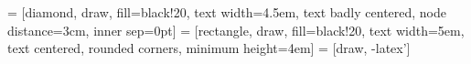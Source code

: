 % 
%

 = [diamond, draw, fill=black!20, text width=4.5em, text badly centered, node distance=3cm, inner sep=0pt]
 = [rectangle, draw, fill=black!20, text width=5em, text centered, rounded corners, minimum height=4em]
 = [draw, -latex']